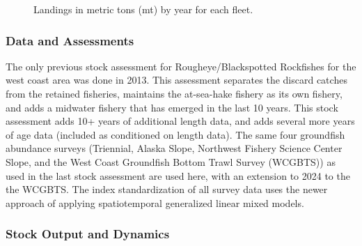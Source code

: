\documentclass[
]{scrartcl}
\begin{document}
\endgroup

\begin{figure}[H]


\caption{\label{fig-es-landings}Landings in metric tons (mt) by year for
each fleet.}

\end{figure}%

\subsubsection{Data and Assessments}\label{data-and-assessments}

The only previous stock assessment for Rougheye/Blackspotted Rockfishes
for the west coast area was done in 2013. This assessment separates the
discard catches from the retained fisheries, maintains the at-sea-hake
fishery as its own fishery, and adds a midwater fishery that has emerged
in the last 10 years. This stock assessment adds 10+ years of additional
length data, and adds several more years of age data (included as
conditioned on length data). The same four groundfish abundance surveys
(Triennial, Alaska Slope, Northwest Fishery Science Center Slope, and
the West Coast Groundfish Bottom Trawl Survey (WCGBTS)) as used in the
last stock assessment are used here, with an extension to 2024 to the
the WCGBTS. The index standardization of all survey data uses the newer
approach of applying spatiotemporal generalized linear mixed models.

\subsubsection{Stock Output and
Dynamics}\label{stock-output-and-dynamics}
\end{document}

